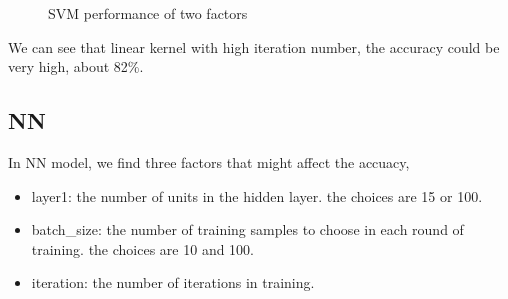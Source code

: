\documentclass{article}
\begin{document}
 	\begin{figure}[htbp]
 		\centering
 		\caption{SVM performance of two factors}
 	\end{figure}
	
	We can see that linear kernel with high iteration number, the accuracy could be very high, about 82\%. 
	
	\subsection{NN}
	
	In NN model, we find three factors that might affect the accuacy,
	
	\begin{itemize}
		\item layer1: the number of units in the hidden layer. the choices are 15 or 100.
		\item batch\_size: the number of training samples to choose in each round of training. the choices are 10 and 100.
		\item iteration: the number of iterations in training.
	\end{itemize}
\end{document}
